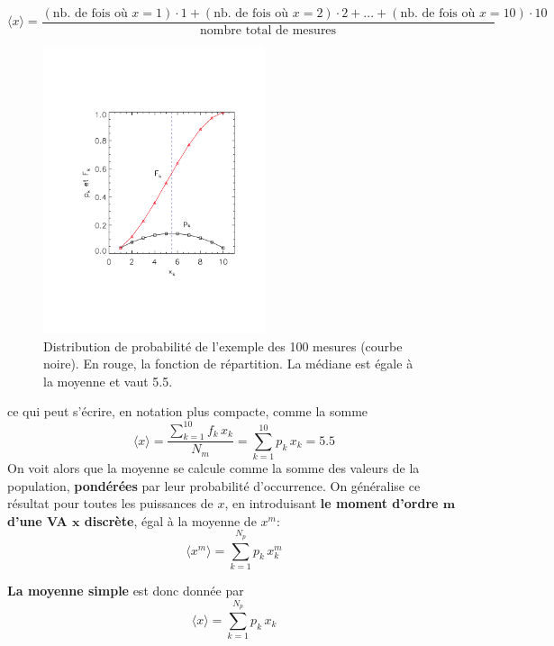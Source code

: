 \documentclass[main.tex]{subfiles}
\begin{document}
\begin{equation*}
    \langle x\rangle=\frac{
        (\text{nb. de fois où $x\!=\!1$})\!\cdot\!1 +
        (\text{nb. de fois où $x\!=\!2$})\!\cdot\!2 + ... +
        (\text{nb. de fois où $x\!=\!10$})\!\cdot\!10}{\text{nombre total de mesures}}
\end{equation*}
\begin{figure}
    \centering
    \vspace{-4mm}
    \includegraphics[width=6.5cm]{assets/figures/probabiliteEtfonctiondeRepartition.pdf}
    \caption{Distribution de probabilité de l'exemple des 100 mesures (courbe noire). En rouge, la fonction de répartition. La médiane est égale à la moyenne et vaut 5.5.}
    \label{fig:edfdr}
\end{figure}

ce qui peut s'écrire, en notation plus compacte, comme la somme
\begin{equation}
    \langle x\rangle=\frac{\sum_{k=1}^{10}f_k\,x_k}{N_m}=\sum_{k=1}^{10}p_k\,x_k=5.5
\end{equation}
On voit alors que la moyenne se calcule comme la somme des valeurs de la population, \textbf{pondérées} par leur probabilité d'occurrence. On généralise ce résultat pour toutes les puissances de $x$, en introduisant \textbf{le moment d'ordre $\mathbf{m}$ d'une VA $\mathbf{x}$ discrète}, égal à la moyenne de $x^m$:
\begin{equation}
    \langle x^m\rangle=\sum_{k=1}^{N_p}p_k\,x_k^m
\end{equation}

\noindent\textbf{La moyenne simple} est donc donnée par
\begin{equation}
    \langle x\rangle=\sum_{k=1}^{N_p}p_k\,x_k
\end{equation}
\end{document}
